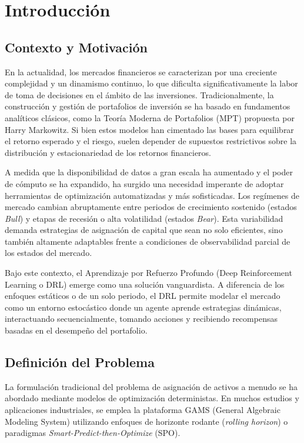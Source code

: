 \chapter{Introducción}

\section{Contexto y Motivación}
En la actualidad, los mercados financieros se caracterizan por una creciente complejidad y un dinamismo continuo, lo que dificulta significativamente la labor de toma de decisiones en el ámbito de las inversiones. Tradicionalmente, la construcción y gestión de portafolios de inversión se ha basado en fundamentos analíticos clásicos, como la Teoría Moderna de Portafolios (MPT) propuesta por Harry Markowitz. Si bien estos modelos han cimentado las bases para equilibrar el retorno esperado y el riesgo, suelen depender de supuestos restrictivos sobre la distribución y estacionariedad de los retornos financieros.

A medida que la disponibilidad de datos a gran escala ha aumentado y el poder de cómputo se ha expandido, ha surgido una necesidad imperante de adoptar herramientas de optimización automatizadas y más sofisticadas. Los regímenes de mercado cambian abruptamente entre periodos de crecimiento sostenido (estados \textit{Bull}) y etapas de recesión o alta volatilidad (estados \textit{Bear}). Esta variabilidad demanda estrategias de asignación de capital que sean no solo eficientes, sino también altamente adaptables frente a condiciones de observabilidad parcial de los estados del mercado.

Bajo este contexto, el Aprendizaje por Refuerzo Profundo (Deep Reinforcement Learning o DRL) emerge como una solución vanguardista. A diferencia de los enfoques estáticos o de un solo periodo, el DRL permite modelar el mercado como un entorno estocástico donde un agente aprende estrategias dinámicas, interactuando secuencialmente, tomando acciones y recibiendo recompensas basadas en el desempeño del portafolio.

\section{Definición del Problema}
La formulación tradicional del problema de asignación de activos a menudo se ha abordado mediante modelos de optimización deterministas. En muchos estudios y aplicaciones industriales, se emplea la plataforma GAMS (General Algebraic Modeling System) utilizando enfoques de horizonte rodante (\textit{rolling horizon}) o paradigmas \textit{Smart-Predict-then-Optimize} (SPO). 

